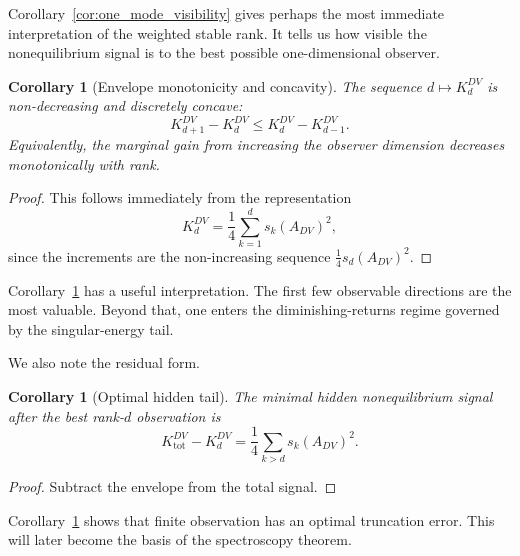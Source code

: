 \documentclass[11pt,a4paper]{article}
\numberwithin{equation}{section}
\theoremstyle{thmcompact}
\newtheorem{corollary}[theorem]{Corollary}
\theoremstyle{remark}
\begin{document}
Corollary~\ref{cor:one_mode_visibility} gives perhaps the most immediate interpretation of the weighted stable rank. It tells us how visible the nonequilibrium signal is to the best possible one-dimensional observer.

\begin{corollary}[Envelope monotonicity and concavity]
\label{cor:envelope_monotonicity_concavity}
The sequence \(d\mapsto K_d^{DV}\) is non-decreasing and discretely concave:
\begin{equation}
K_{d+1}^{DV}-K_d^{DV}
\le
K_d^{DV}-K_{d-1}^{DV}.
\end{equation}
Equivalently, the marginal gain from increasing the observer dimension decreases monotonically with rank.
\end{corollary}

\begin{proof}
This follows immediately from the representation
\begin{equation}
K_d^{DV}=\frac14\sum_{k=1}^{d}s_k(A_{DV})^2,
\end{equation}
since the increments are the non-increasing sequence \(\frac14 s_d(A_{DV})^2\).
\end{proof}

Corollary~\ref{cor:envelope_monotonicity_concavity} has a useful interpretation. The first few observable directions are the most valuable. Beyond that, one enters the diminishing-returns regime governed by the singular-energy tail.

We also note the residual form.

\begin{corollary}[Optimal hidden tail]
\label{cor:optimal_hidden_tail}
The minimal hidden nonequilibrium signal after the best rank-\(d\) observation is
\begin{equation}
K_{\mathrm{tot}}^{DV}-K_d^{DV}
=
\frac14\sum_{k>d}s_k(A_{DV})^2.
\end{equation}
\end{corollary}

\begin{proof}
Subtract the envelope from the total signal.
\end{proof}

Corollary~\ref{cor:optimal_hidden_tail} shows that finite observation has an optimal truncation error. This will later become the basis of the spectroscopy theorem.
\end{document}

